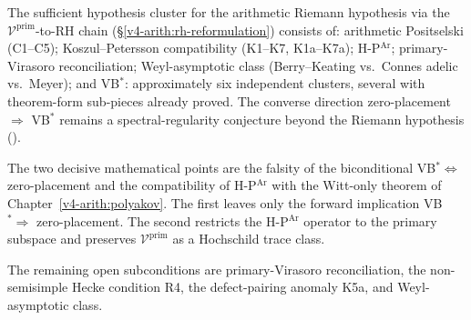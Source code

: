 The sufficient hypothesis cluster for the arithmetic Riemann
hypothesis via the \(\mathcal{V}^{\mathrm{prim}}\)-to-RH chain
(\S\ref{v4-arith:rh-reformulation}) consists of:
arithmetic Positselski (C1--C5);
Koszul--Petersson compatibility (K1--K7, K1a--K7a);
H-P\(^{\mathrm{Ar}}\);
primary-Virasoro reconciliation;
Weyl-asymptotic class (Berry--Keating vs.~Connes adelic vs.~Meyer);
and VB\(^{*}\): approximately six independent clusters,
several with theorem-form sub-pieces already proved.
The converse direction zero-placement \(\Rightarrow\) VB\(^{*}\) remains
a spectral-regularity conjecture beyond the Riemann hypothesis
().

The two decisive mathematical points are the falsity of the
biconditional VB\(^{*}\Leftrightarrow\) zero-placement and the
compatibility of H-P\(^{\mathrm{Ar}}\) with the Witt-only theorem of
Chapter~\ref{v4-arith:polyakov}. The first leaves only the forward
implication VB\(^{*}\Rightarrow\) zero-placement. The second restricts
the H-P\(^{\mathrm{Ar}}\) operator to the primary subspace and
preserves \(\mathcal{V}^{\mathrm{prim}}\) as a Hochschild trace class.

The remaining open subconditions are primary-Virasoro reconciliation,
the non-semisimple Hecke condition R4, the defect-pairing anomaly
K5a, and Weyl-asymptotic class.
